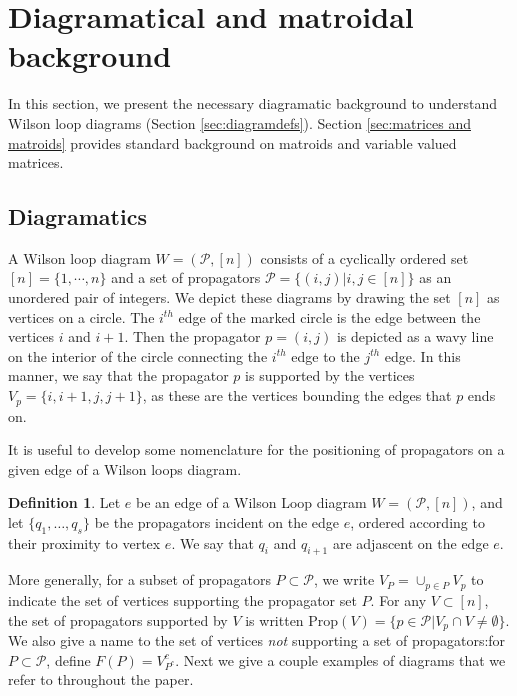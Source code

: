 \documentclass[11pt]{article}
\newcommand{\cP}{\mathcal{P}}
\newcommand{\Prop}{\textrm{Prop}}
\theoremstyle{remark}
\theoremstyle{definition}
\newtheorem{dfn}[thm]{Definition}
\begin{document}
\section{Diagramatical and matroidal background \label{sec:background}}

In this section, we present the necessary diagramatic background to understand Wilson loop diagrams (Section \ref{sec:diagramdefs}). Section \ref{sec:matrices and matroids} provides standard background on matroids and variable valued matrices.

\subsection{Diagramatics \label{sec:diagramdefs}}
A Wilson loop diagram $W = (\cP, [n])$ consists of a cyclically ordered set $[n] = \{1, \cdots, n\}$ and a set of propagators $\cP = \{(i,j) | i, j \in [n]\}$ as an unordered pair of integers. We depict these diagrams by drawing the set $[n]$ as vertices on a circle. The $i^{th}$ edge of the marked circle is the edge between the vertices $i$ and $i+1$. Then the propagator $p =(i,j)$ is depicted as a wavy line on the interior of the circle connecting the $i^{th}$ edge to the $j^{th}$ edge. In this manner, we say that the propagator $p$ is supported by the vertices $V_p = \{i, i+1, j, j+1\}$, as these are the vertices bounding the edges that $p$ ends on. 

It is useful to develop some nomenclature for the positioning of propagators on a given edge of a Wilson loops diagram.  
\begin{dfn}\label{dfn:adjascentprops} Let $e$ be an edge of a Wilson Loop diagram $W = (\cP, [n])$, and  let $\{q_1, \ldots, q_s \}$ be the propagators incident on the edge $e$, ordered according to their proximity to vertex $e$. We say that $q_i$ and $q_{i+1}$ are adjascent on the edge $e$. \end{dfn}

More generally, for a subset of propagators $P \subset \cP$, we write $V_P = \cup_{p \in P} V_p$ to indicate the set of vertices supporting the propagator set $P$. For any $V \subset [n]$, the set of propagators supported by $V$ is written $\Prop(V) = \{ p \in \cP | V_p \cap V \neq \emptyset\}$.  We also give a name to the set of vertices \emph{not} supporting a set of propagators:for $P \subset \cP$, define $F(P) = V_{P^c}^c$. Next we give a couple examples of diagrams that we refer to throughout the paper.
\end{document}
